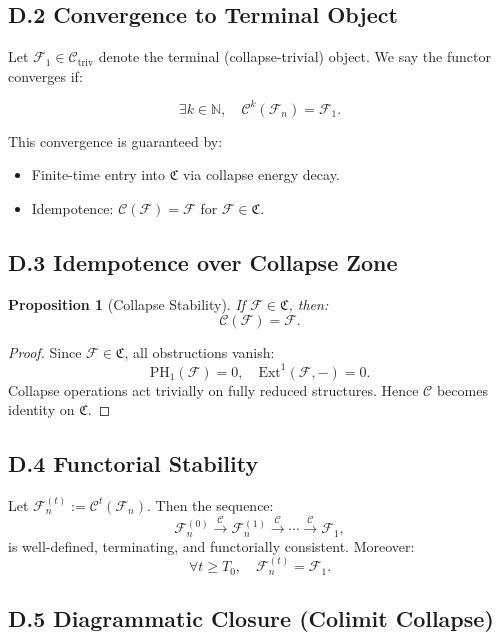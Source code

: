 \documentclass[11pt]{article}
\newtheorem{proposition}[theorem]{Proposition}
\begin{document}
\subsection*{D.2 Convergence to Terminal Object}

Let \( \mathcal{F}_1 \in \mathcal{C}_{\mathrm{triv}} \) denote the terminal (collapse-trivial) object. We say the functor converges if:

\[
\exists k \in \mathbb{N},\quad \mathcal{C}^k(\mathcal{F}_n) = \mathcal{F}_1.
\]

This convergence is guaranteed by:
\begin{itemize}
  \item Finite-time entry into \( \mathfrak{C} \) via collapse energy decay.
  \item Idempotence: \( \mathcal{C}(\mathcal{F}) = \mathcal{F} \) for \( \mathcal{F} \in \mathfrak{C} \).
\end{itemize}

\subsection*{D.3 Idempotence over Collapse Zone}

\begin{proposition}[Collapse Stability]
If \( \mathcal{F} \in \mathfrak{C} \), then:
\[
\mathcal{C}(\mathcal{F}) = \mathcal{F}.
\]
\end{proposition}

\begin{proof}
Since \( \mathcal{F} \in \mathfrak{C} \), all obstructions vanish:
\[
\mathrm{PH}_1(\mathcal{F}) = 0,\quad \mathrm{Ext}^1(\mathcal{F}, -) = 0.
\]
Collapse operations act trivially on fully reduced structures. Hence \( \mathcal{C} \) becomes identity on \( \mathfrak{C} \).
\end{proof}

\subsection*{D.4 Functorial Stability}

Let \( \mathcal{F}_n^{(t)} := \mathcal{C}^t(\mathcal{F}_n) \). Then the sequence:
\[
\mathcal{F}_n^{(0)} \xrightarrow{\mathcal{C}} \mathcal{F}_n^{(1)} \xrightarrow{\mathcal{C}} \cdots \xrightarrow{\mathcal{C}} \mathcal{F}_1,
\]
is well-defined, terminating, and functorially consistent. Moreover:
\[
\forall t \geq T_0,\quad \mathcal{F}_n^{(t)} = \mathcal{F}_1.
\]

\subsection*{D.5 Diagrammatic Closure (Colimit Collapse)}
\end{document}
